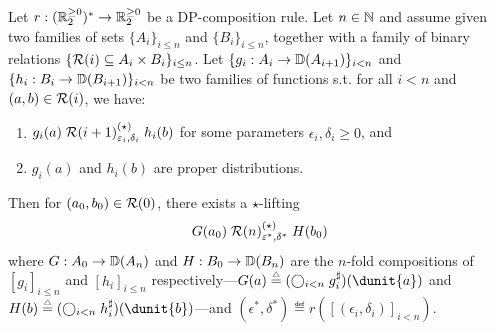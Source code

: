 \documentclass{lmcs}
\begin{document}
\begin{lem} \label{l:star:comp}
  Let $r : (\mathbb{R}^{\geq 0}_2)^* \to \mathbb{R}^{\geq 0}_2$ be a DP-composition rule.
  Let $n \in \mathbb{N}$ and assume given two families of sets
  $\{A_i\}_{i \leq n}$ and $\{B_i\}_{i \leq n}$, together with a
  family of binary relations
  $\{ \mathcal{R}(i) \subseteq A_i \times B_i \}_{i \leq n}$.
  Let
  $\{ g_i : A_i \to {\mathbb{D}}(A_{i+1}) \}_{i < n}$ and
  $\{ h_i : B_i \to {\mathbb{D}}(B_{i+1}) \}_{i < n}$ be two families of functions s.t.
  for all $i < n$ and $(a, b) \in \mathcal{R}(i)$, we have:
  \begin{enumerate}
  \item
    $g_i(a) \mathrel{\mathrel{\mathcal{R}(i + 1)^{(\star)}_{\varepsilon_i, \delta_i}}}
    h_i(b)$ for some parameters $\epsilon_i, \delta_i \geq 0$, and
  \item
    $g_i(a)$ and $h_i(b)$ are proper distributions.
  \end{enumerate}
  Then for $(a_0, b_0) \in \mathcal{R}(0)$, there exists a $\star$-lifting
  \[
    G(a_0) \mathrel{\mathrel{\mathcal{R}(n)^{(\star)}_{\varepsilon^*, \delta^*}}} H(b_0) 
  \]
  where $G : A_0 \to {\mathbb{D}}(A_n)$ and $H : B_0 \to {\mathbb{D}}(B_n)$ are the $n$-fold
  compositions of $[ g_i ]_{i \leq n}$ and $[ h_i ]_{i \leq n}$
  respectively---\ie $G(a) \eqdef (\bigcirc_{i < n} \lift{g_i})(\dunit{a})$ and
  $H(b) \eqdef (\bigcirc_{i < n} \lift{h_i})(\dunit{b})$---and $(\epsilon^*,
  \delta^*) \eqdef r([(\epsilon_i, \delta_i)]_{i < n})$.
\end{lem}
\end{document}
